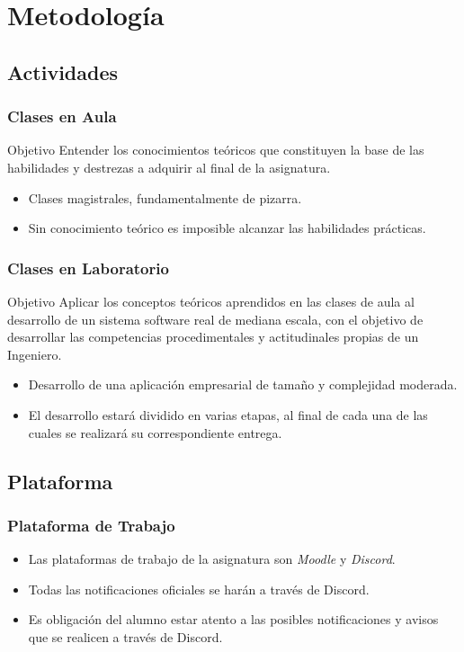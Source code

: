 \documentclass[handout,a4paper,t,xcolor=pst,colortheme]{beamer}
\begin{document}
\section{Metodología}

\subsection{Actividades}

\begin{frame}[c]
	\frametitle{Clases en Aula}
	\begin{block}{Objetivo}
		Entender los conocimientos teóricos que constituyen la base de las habilidades y destrezas a adquirir al final de la asignatura.
	\end{block}
	\begin{itemize}
		\item<2-> Clases magistrales, fundamentalmente de pizarra.
		\item<3-> Sin conocimiento teórico es imposible alcanzar las habilidades prácticas.
	\end{itemize}
\end{frame}

\begin{frame}[c]
	\frametitle{Clases en Laboratorio}
	\begin{block}{Objetivo}
		Aplicar los conceptos teóricos aprendidos en las clases de aula al desarrollo de un sistema software real de mediana escala, con el objetivo de desarrollar las competencias procedimentales y actitudinales propias de un Ingeniero.
	\end{block}
	\begin{itemize}
		\item<2-> Desarrollo de una aplicación empresarial de tamaño y complejidad moderada.
		\item<3-> El desarrollo estará dividido en varias etapas, al final de cada una de las cuales se realizará su correspondiente entrega.
	\end{itemize}
\end{frame}

\subsection{Plataforma}

\begin{frame}[c]
	\frametitle{Plataforma de Trabajo}
	\begin{itemize}
		\item<1-> Las plataformas de trabajo de la asignatura son \emph{Moodle} y \emph{Discord}.
		\item<2-> Todas las notificaciones oficiales se harán a través de Discord.
		\item<3-> Es obligación del alumno estar atento a las posibles notificaciones y avisos que se realicen a través de Discord.
	\end{itemize}
\end{frame}
\end{document}
